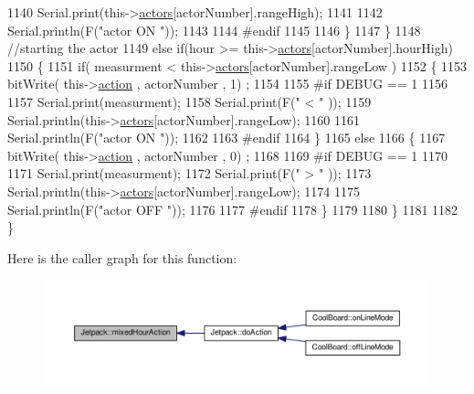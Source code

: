 \begin{DoxyCode}
1140                 Serial.print(this->\hyperlink{class_jetpack_a7e16d2f97837f9712a2e6de1c50d99db}{actors}[actorNumber].rangeHigh);
1141 
1142                 Serial.println(F(\textcolor{stringliteral}{"actor ON "}));
1143 
1144 \textcolor{preprocessor}{            #endif  }
1145                 
1146             \}
1147     \}
1148     \textcolor{comment}{//starting the actor}
1149     \textcolor{keywordflow}{else} \textcolor{keywordflow}{if}(hour >= this->\hyperlink{class_jetpack_a7e16d2f97837f9712a2e6de1c50d99db}{actors}[actorNumber].hourHigh)
1150     \{
1151             \textcolor{keywordflow}{if}( measurment < this->\hyperlink{class_jetpack_a7e16d2f97837f9712a2e6de1c50d99db}{actors}[actorNumber].rangeLow )
1152             \{
1153                 bitWrite( this->\hyperlink{class_jetpack_aca3142925a7b0834b34ae91d26af7765}{action} , actorNumber , 1) ;
1154 
1155 \textcolor{preprocessor}{            #if DEBUG == 1 }
1156 
1157                 Serial.print(measurment);
1158                 Serial.print(F(\textcolor{stringliteral}{" < "} ));
1159                 Serial.println(this->\hyperlink{class_jetpack_a7e16d2f97837f9712a2e6de1c50d99db}{actors}[actorNumber].rangeLow);
1160 
1161                 Serial.println(F(\textcolor{stringliteral}{"actor ON "}));
1162 
1163 \textcolor{preprocessor}{            #endif  }
1164             \}
1165             \textcolor{keywordflow}{else} 
1166             \{
1167                 bitWrite( this->\hyperlink{class_jetpack_aca3142925a7b0834b34ae91d26af7765}{action} , actorNumber , 0) ;
1168 
1169 \textcolor{preprocessor}{            #if DEBUG == 1 }
1170 
1171                 Serial.print(measurment);
1172                 Serial.print(F(\textcolor{stringliteral}{" > "} ));
1173                 Serial.println(this->\hyperlink{class_jetpack_a7e16d2f97837f9712a2e6de1c50d99db}{actors}[actorNumber].rangeLow);
1174 
1175                 Serial.println(F(\textcolor{stringliteral}{"actor OFF "}));
1176 
1177 \textcolor{preprocessor}{            #endif                  }
1178             \}
1179 
1180     \}
1181 
1182 \}
\end{DoxyCode}
Here is the caller graph for this function\+:\nopagebreak
\begin{figure}[H]
\begin{center}
\leavevmode
\includegraphics[width=350pt]{df/d1d/class_jetpack_ac1a49ab4867718cdb415ad74c2066b9d_icgraph}
\end{center}
\end{figure}
\mbox{\label{class_jetpack_a273dae1517b56f0242e28b8944edc26b}} 
